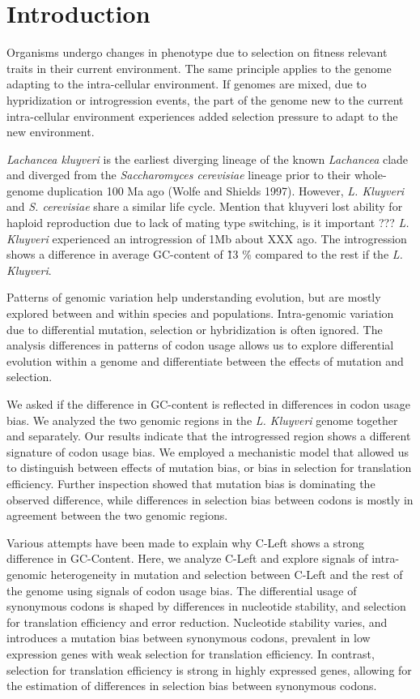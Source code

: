 \documentclass[12pt,draft]{article}
\begin{document}
\doublespacing
\linenumbers


\section*{Introduction}

Organisms undergo changes in phenotype due to selection on fitness relevant traits in their current environment. 
The same principle applies to the genome adapting to the intra-cellular environment.
If genomes are mixed, due to hypridization or introgression events, the part of the genome new to the current intra-cellular environment experiences added selection pressure to adapt to the new environment.

\textit{Lachancea kluyveri} is the earliest diverging lineage of the known \textit{Lachancea} clade and diverged from the \textit{Saccharomyces cerevisiae} lineage prior to their whole-genome duplication 100 Ma ago (Wolfe and Shields 1997). 
However, \textit{L. Kluyveri} and \textit{S. cerevisiae} share a similar life cycle.
Mention that kluyveri lost ability for haploid reproduction due to lack of mating type switching, is it important ???
\textit{L. Kluyveri} experienced an introgression of 1Mb about XXX ago. 
The introgression shows a difference in average GC-content of \~ 13 \% compared to the rest if the \textit{L. Kluyveri}.

Patterns of genomic variation help understanding evolution, but are mostly explored between and within species and populations.
Intra-genomic variation due to differential mutation, selection or hybridization is often ignored.
The analysis differences in patterns of codon usage allows us to explore differential evolution within a genome and differentiate between the effects of mutation and selection.

We asked if the difference in GC-content is reflected in differences in codon usage bias.
We analyzed the two genomic regions in the \textit{L. Kluyveri} genome together and separately.
Our results indicate that the introgressed region shows a different signature of codon usage bias.
We employed a mechanistic model that allowed us to distinguish between effects of mutation bias, or bias in selection for translation efficiency.
Further inspection showed that mutation bias is dominating the observed difference, while differences in selection bias between codons is mostly in agreement between the two genomic regions. 

Various attempts have been made to explain why C-Left shows a strong difference in GC-Content.
Here, we analyze C-Left and explore signals of intra-genomic heterogeneity in mutation and selection between C-Left and the rest of the genome using signals of codon usage bias.
The differential usage of synonymous codons is shaped by differences in nucleotide stability, and selection for translation efficiency and error reduction.
Nucleotide stability varies, and introduces a mutation bias between synonymous codons, prevalent in low expression genes with weak selection for translation efficiency.
In contrast, selection for translation efficiency is strong in highly expressed genes, allowing for the estimation of differences in selection bias between synonymous codons.
\end{document}
